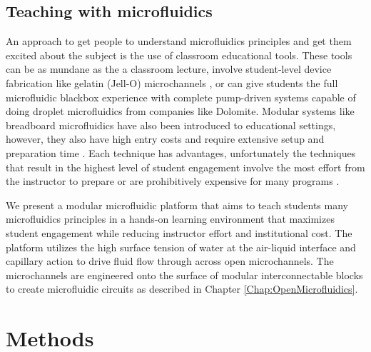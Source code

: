 \subsection{Teaching with microfluidics}
An approach to get people to understand microfluidics principles and get them excited about the subject is the use of classroom educational tools. These tools can be as mundane as the a classroom lecture, involve student-level device fabrication like gelatin (Jell-O) microchannels \cite{Yang2013}, or can give students the full microfluidic blackbox experience with complete pump-driven systems capable of doing droplet microfluidics from companies like Dolomite. Modular systems like breadboard microfluidics have also been introduced to educational settings, however, they also have high entry costs and require extensive setup and preparation time \cite{Chen2011, Shaikh2005, Chen2014, Langelier2011, Papautsky2008}. Each technique has advantages, unfortunately the techniques that result in the highest level of student engagement involve the most effort from the instructor to prepare or are prohibitively expensive for many programs \cite{Fintschenko2011Education:Laboratory}. 

We present a modular microfluidic platform that aims to teach students many microfluidics principles in a hands-on learning environment that maximizes student engagement while reducing instructor effort and institutional cost. The platform utilizes the high surface tension of water at the air-liquid interface and capillary action to drive fluid flow through across open microchannels. The microchannels are engineered onto the surface of modular interconnectable blocks to create microfluidic circuits as described in Chapter \ref{Chap:OpenMicrofluidics}.

\section{Methods}

